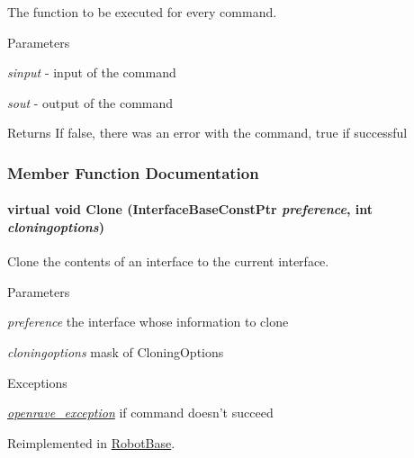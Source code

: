 The function to be executed for every command. 


\begin{DoxyParams}{Parameters}
\item[{\em sinput}]-\/ input of the command \item[{\em sout}]-\/ output of the command \end{DoxyParams}
\begin{DoxyReturn}{Returns}
If false, there was an error with the command, true if successful 
\end{DoxyReturn}


\subsubsection{Member Function Documentation}
\hypertarget{classOpenRAVE_1_1InterfaceBase_aadffdb83bc22dcdd5dd50c27d1bb5496}{
\paragraph[{Clone}]{\setlength{\rightskip}{0pt plus 5cm}virtual void Clone (InterfaceBaseConstPtr {\em preference}, \/  int {\em cloningoptions})}\hfill}
\label{classOpenRAVE_1_1InterfaceBase_aadffdb83bc22dcdd5dd50c27d1bb5496}


Clone the contents of an interface to the current interface. 


\begin{DoxyParams}{Parameters}
\item[{\em preference}]the interface whose information to clone \item[{\em cloningoptions}]mask of CloningOptions \end{DoxyParams}

\begin{DoxyExceptions}{Exceptions}
\item[{\em \hyperlink{classOpenRAVE_1_1openrave__exception}{openrave\_\-exception}}]if command doesn't succeed \end{DoxyExceptions}


Reimplemented in \hyperlink{classOpenRAVE_1_1RobotBase_aadffdb83bc22dcdd5dd50c27d1bb5496}{RobotBase}.

